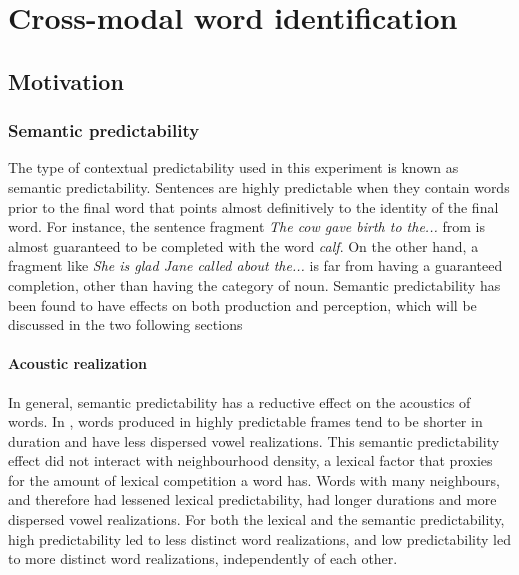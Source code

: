 
\chapter{Cross-modal word identification}


\section{Motivation}

\subsection{Semantic predictability}

The type of contextual predictability used in this experiment is known as semantic predictability.  Sentences are highly predictable when they contain words prior to the final word that points almost definitively to the identity of the final word.  For instance, the sentence fragment \emph{The cow gave birth to the...} from \citet{KalikowEtAl1977} is almost guaranteed to be completed with the word \emph{calf}.  On the other hand, a fragment like \emph{She is glad Jane called about the...} is far from having a guaranteed completion, other than having the category of noun. Semantic predictability has been found to have effects on both production and perception, which will be discussed in the two following sections

\subsubsection{Acoustic realization}

In general, semantic predictability has a reductive effect on the acoustics of words.  In \citet{Scarborough2010}, words produced in highly predictable frames tend to be shorter in duration and have less dispersed vowel realizations.  This semantic predictability effect did not interact with neighbourhood density, a lexical factor that proxies for the amount of lexical competition a word has.  Words with many neighbours, and therefore had lessened lexical predictability, had longer durations and more dispersed vowel realizations.  For both the lexical and the semantic predictability, high predictability led to less distinct word realizations, and low predictability led to more distinct word realizations, independently of each other.

